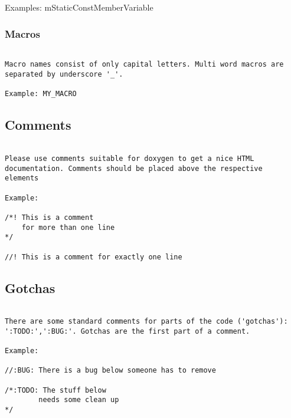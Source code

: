 Examples: mStaticConstMemberVariable

\subsubsection{Macros}
\begin{verbatim}

Macro names consist of only capital letters. Multi word macros are
separated by underscore '_'.

Example: MY_MACRO

\end{verbatim}
\subsection{Comments}
\begin{verbatim}

Please use comments suitable for doxygen to get a nice HTML
documentation. Comments should be placed above the respective
elements

Example:

/*! This is a comment 
    for more than one line
*/

//! This is a comment for exactly one line

\end{verbatim}
\subsection{Gotchas}
\begin{verbatim}

There are some standard comments for parts of the code ('gotchas'): 
':TODO:',':BUG:'. Gotchas are the first part of a comment.

Example:

//:BUG: There is a bug below someone has to remove

/*:TODO: The stuff below
        needs some clean up
*/

\end{verbatim}
